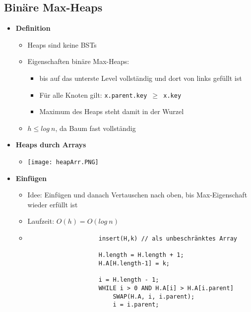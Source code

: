 \subsection{Binäre Max-Heaps}
    \begin{itemize}
        \item \textbf{Definition}
            \begin{itemize}
                \item Heaps sind keine BSTs
                \item Eigenschaften binäre Max-Heaps:
                    \begin{itemize}
                        \item bis auf das unterste Level vollständig und dort von links gefüllt ist
                        \item Für alle Knoten gilt: \texttt{x.parent.key $\geq$ x.key}
                        \item Maximum des Heaps steht damit in der Wurzel
                    \end{itemize}
                \item $h \leq log~n$, da Baum fast vollständig
            \end{itemize}

        \item \textbf{Heaps durch Arrays}
            \begin{itemize}
                \item[] \texttt{[image: heapArr.PNG]}
            \end{itemize}

        \item \textbf{Einfügen}
            \begin{itemize}
                \item Idee: Einfügen und danach Vertauschen nach oben, bis Max-Eigenschaft wieder erfüllt ist
                \item Laufzeit: $O(h) = O(log~n)$
                \item[]
                    \begin{verbatim}
                    insert(H,k) // als unbeschränktes Array

                    H.length = H.length + 1;
                    H.A[H.length-1] = k;

                    i = H.length - 1;
                    WHILE i > 0 AND H.A[i] > H.A[i.parent]
                        SWAP(H.A, i, i.parent);
                        i = i.parent;
                    \end{verbatim}
            \end{itemize}


\end{itemize}
